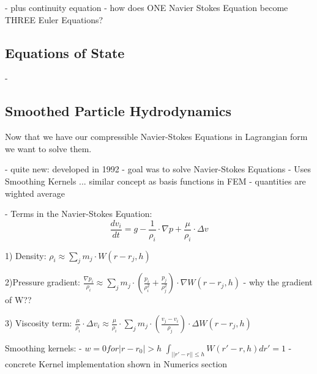 - plus continuity equation
- how does ONE Navier Stokes Equation become THREE Euler Equations?

\subsection{Equations of State}
-

\subsection{Smoothed Particle Hydrodynamics}
Now that we have our compressible Navier-Stokes Equations in Lagrangian form we want to solve them.

- quite new: developed in 1992
- goal was to solve Navier-Stokes Equations
- Uses Smoothing Kernels ... similar concept as basis functions in FEM
- quantities are wighted average

- Terms in the Navier-Stokes Equation:
\begin{equation} \frac{dv_i}{dt} = g - \frac{1}{\rho_i}\cdot \nabla p + \frac{\mu}{\rho_i} \cdot \Delta  v \end{equation}

1) Density:
$ \rho_i \approx \sum_j m_j \cdot W(r - r_j,h) $

2)Pressure gradient:
$ \frac{\nabla p_i}{\rho_i} \approx \sum_j m_j \cdot (\frac{p_i}{\rho^2_i} + \frac{p_j}{\rho^2_j}) \cdot \nabla W(r - r_j, h) $
- why the gradient of W??

3) Viscosity term:
$ \frac{\mu}{\rho_i} \cdot \Delta v_i \approx \frac{\mu}{\rho_i} \cdot \sum_j m_j \cdot (\frac{v_j - v_i}{\rho_j}) \cdot \Delta W(r - r_j, h) $

Smoothing kernels:
- $ w = 0 for |r - r_0| > h $
$ \int_{||r' - r|| \leq h} W(r' - r, h)dr' = 1 $
- concrete Kernel implementation shown in Numerics section